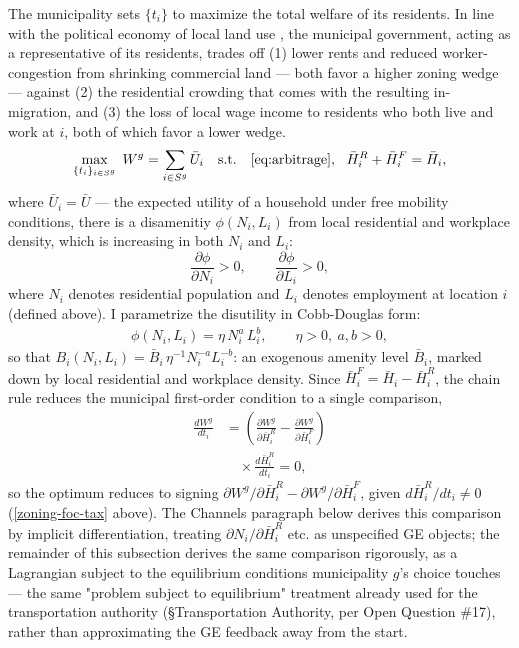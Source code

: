 \documentclass[12pt, a4paper]{article}
\theoremstyle{definition}
\theoremstyle{remark}
\begin{document}
The municipality sets $\{t_i\}$ to maximize the total welfare of its residents. In line with the political economy of local land use \citep{Mast2024-zi, Rollet2025-mk}, the municipal government, acting as a representative of its residents, trades off (1) lower rents and reduced worker-congestion from shrinking commercial land — both favor a higher zoning wedge — against (2) the residential crowding that comes with the resulting in-migration, and (3) the loss of local wage income to residents who both live and work at $i$, both of which favor a lower wedge.
\[
\max_{\{t_i\}_{i \in S^g}}\; W^g = \sum_{i \in S^g} \bar{U}_{i}
\quad\text{s.t.}\quad
\eqref{eq:arbitrage},\ \ \bar{H}_i^R + \bar{H}_i^F = \bar{H}_i,
\]
where $\bar{U}_i =\bar{U}$ — the expected utility of a household under free mobility conditions, there is a disamenitiy $\phi(N_i,L_i)$ from local residential and workplace density, which is increasing in both $N_i$ and $L_i$:
\[
\frac{\partial \phi}{\partial N_i} > 0, \qquad \frac{\partial \phi}{\partial L_i} > 0,
\]
where $N_i$ denotes residential population and $L_i$ denotes employment at location $i$ (defined above). I parametrize the disutility in Cobb-Douglas form:
\begin{align}
    \phi(N_i, L_i) = \eta\, N_i^{a}\, L_i^{b}, \qquad \eta > 0,\ a, b > 0,
\end{align}
so that $B_i(N_i,L_i) = \bar B_i\,\eta^{-1} N_i^{-a}L_i^{-b}$: an exogenous amenity level $\bar B_i$, marked down by local residential and workplace density. Since $\bar H_i^F = \bar H_i - \bar H_i^R$, the chain rule reduces the municipal first-order condition to a single comparison,
\begin{align}
    \label{zoning-foc}
\frac{dW^g}{dt_i} &= \left(\frac{\partial W^g}{\partial \bar{H}_i^R} - \frac{\partial W^g}{\partial \bar{H}_i^F}\right)\\
&\quad\times\frac{d\bar H_i^R}{dt_i} = 0,
\end{align}
so the optimum reduces to signing $\partial W^g/\partial \bar H_i^R - \partial W^g/\partial \bar H_i^F$, given $d\bar H_i^R/dt_i \neq 0$ (\eqref{zoning-foc-tax} above). The Channels paragraph below derives this comparison by implicit differentiation, treating $\partial N_i/\partial\bar H_i^R$ etc. as unspecified GE objects; the remainder of this subsection derives the same comparison rigorously, as a Lagrangian subject to the equilibrium conditions municipality $g$'s choice touches — the same "problem subject to equilibrium" treatment already used for the transportation authority (\S Transportation Authority, per Open Question \#17), rather than approximating the GE feedback away from the start.
\end{document}

